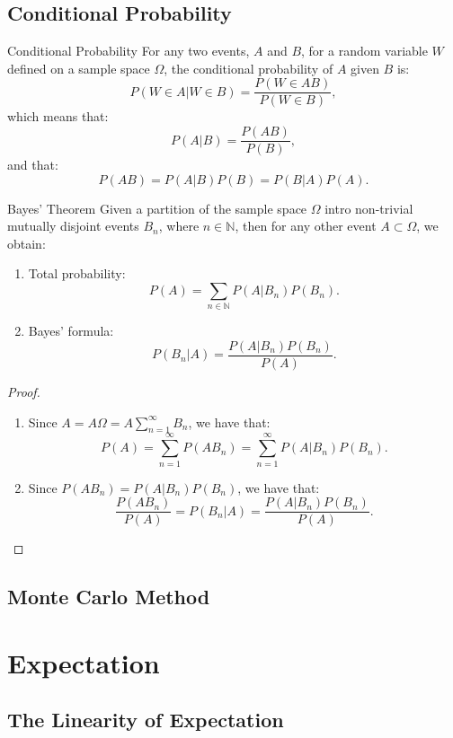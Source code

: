 \documentclass[11pt]{article}
\newenvironment{definition}[1]{\begin{defbox}{#1}{}}{\end{defbox}}
\newenvironment{theorem}[1]{\begin{thmbox}{#1}{}}{\end{thmbox}}
\theoremstyle{quiet}
\theoremstyle{quietremark}
\newcommand{\1}{\mathbf{1}}            %
\begin{document}
\subsection{Conditional Probability}
\begin{definition}{Conditional Probability}
For any two events, $A$ and $B$, for a random variable $W$ defined on a sample space $\Omega$, the conditional probability of $A$ given $B$ is:
\[
P(W\in A|W\in B)=\frac{P(W\in AB)}{P(W\in B)},
\]
which means that:
\[
P(A|B)=\frac{P(AB)}{P(B)},
\]
and that:
\[
P(AB)=P(A|B)P(B)=P(B|A)P(A).
\]
\end{definition}

\begin{theorem}{Bayes' Theorem}
Given a partition of the sample space $\Omega$ intro non-trivial mutually disjoint events $B_n$, where $n\in\mathbb{N}$, then for any other event $A\subset\Omega$, we obtain:
\begin{enumerate}
\item Total probability:
\[
\displaystyle P(A)=\sum_{n\in\mathbb{N}}P(A|B_n)P(B_n).
\]
\item Bayes' formula:
\[
\displaystyle P(B_n|A)=\frac{P(A|B_n)P(B_n)}{P(A)}.
\]
\end{enumerate}
\end{theorem}

\begin{proof}
\begin{enumerate}
\item Since $A=A\Omega=A\sum_{n=1}^\infty B_n$, we have that:
\[
P(A)=\sum_{n=1}^\infty P(AB_n)=\sum_{n=1}^\infty P(A|B_n)P(B_n).
\]
\item Since $P(AB_n)=P(A|B_n)P(B_n)$, we have that:
\[
\frac{P(AB_n)}{P(A)}=P(B_n|A)=\frac{P(A|B_n)P(B_n)}{P(A)}.
\]
\end{enumerate}
\end{proof}


\subsection{Monte Carlo Method}

\newpage
\section{Expectation}

\subsection{The Linearity of Expectation}
\end{document}
